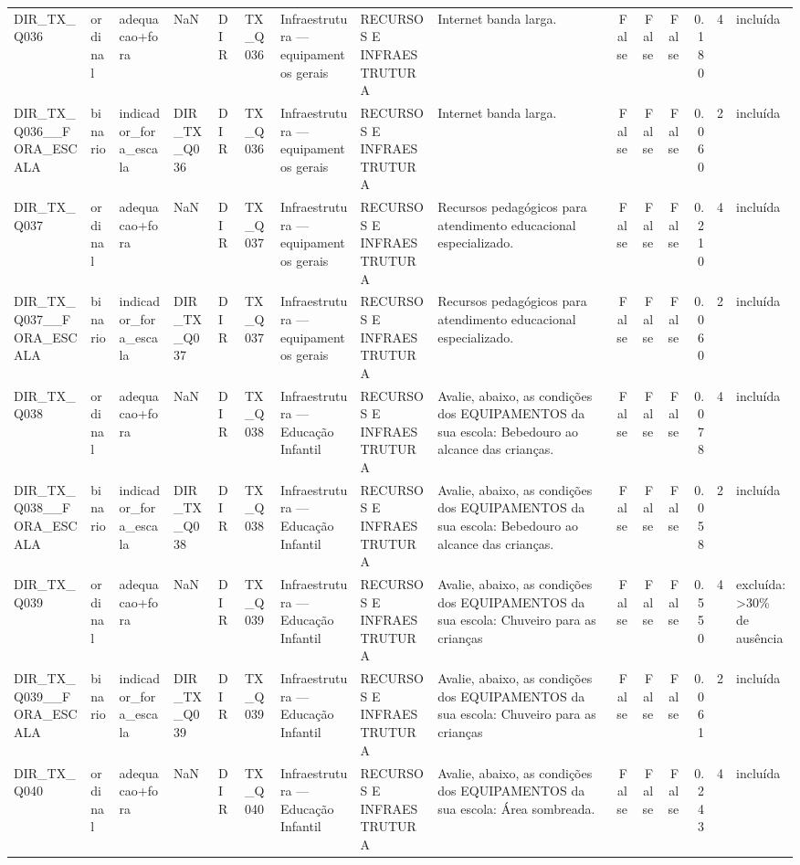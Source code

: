 \begin{tabular}{lllllllllrrrrrl}
DIR\_TX\_Q036 & ordinal & adequacao+fora & NaN & DIR & TX\_Q036 & Infraestrutura — equipamentos gerais & RECURSOS E INFRAESTRUTURA & Internet banda larga. & False & False & False & 0.180 & 4 & incluída \\
DIR\_TX\_Q036\_\_FORA\_ESCALA & binario & indicador\_fora\_escala & DIR\_TX\_Q036 & DIR & TX\_Q036 & Infraestrutura — equipamentos gerais & RECURSOS E INFRAESTRUTURA & Internet banda larga. & False & False & False & 0.060 & 2 & incluída \\
DIR\_TX\_Q037 & ordinal & adequacao+fora & NaN & DIR & TX\_Q037 & Infraestrutura — equipamentos gerais & RECURSOS E INFRAESTRUTURA & Recursos pedagógicos para atendimento educacional especializado. & False & False & False & 0.210 & 4 & incluída \\
DIR\_TX\_Q037\_\_FORA\_ESCALA & binario & indicador\_fora\_escala & DIR\_TX\_Q037 & DIR & TX\_Q037 & Infraestrutura — equipamentos gerais & RECURSOS E INFRAESTRUTURA & Recursos pedagógicos para atendimento educacional especializado. & False & False & False & 0.060 & 2 & incluída \\
DIR\_TX\_Q038 & ordinal & adequacao+fora & NaN & DIR & TX\_Q038 & Infraestrutura — Educação Infantil & RECURSOS E INFRAESTRUTURA & Avalie, abaixo, as condições dos EQUIPAMENTOS da sua escola: Bebedouro ao alcance das crianças. & False & False & False & 0.078 & 4 & incluída \\
DIR\_TX\_Q038\_\_FORA\_ESCALA & binario & indicador\_fora\_escala & DIR\_TX\_Q038 & DIR & TX\_Q038 & Infraestrutura — Educação Infantil & RECURSOS E INFRAESTRUTURA & Avalie, abaixo, as condições dos EQUIPAMENTOS da sua escola: Bebedouro ao alcance das crianças. & False & False & False & 0.058 & 2 & incluída \\
DIR\_TX\_Q039 & ordinal & adequacao+fora & NaN & DIR & TX\_Q039 & Infraestrutura — Educação Infantil & RECURSOS E INFRAESTRUTURA & Avalie, abaixo, as condições dos EQUIPAMENTOS da sua escola:  Chuveiro para as crianças & False & False & False & 0.550 & 4 & excluída: >30\% de ausência \\
DIR\_TX\_Q039\_\_FORA\_ESCALA & binario & indicador\_fora\_escala & DIR\_TX\_Q039 & DIR & TX\_Q039 & Infraestrutura — Educação Infantil & RECURSOS E INFRAESTRUTURA & Avalie, abaixo, as condições dos EQUIPAMENTOS da sua escola:  Chuveiro para as crianças & False & False & False & 0.061 & 2 & incluída \\
DIR\_TX\_Q040 & ordinal & adequacao+fora & NaN & DIR & TX\_Q040 & Infraestrutura — Educação Infantil & RECURSOS E INFRAESTRUTURA & Avalie, abaixo, as condições dos EQUIPAMENTOS da sua escola: Área sombreada. & False & False & False & 0.243 & 4 & incluída \\

\end{tabular}
